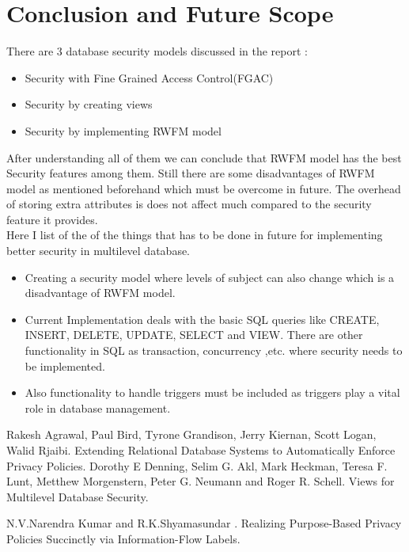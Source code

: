 \documentclass[11pt,a4paper]{report}
\begin{document}
\chapter{Conclusion and Future Scope}
There are 3 database security models discussed in the report : 
\begin{itemize}
    \item Security with Fine Grained Access Control(FGAC)
    \item Security by creating views 
    \item Security by implementing RWFM model 
\end{itemize}
After understanding all of them we can conclude that RWFM model has the best Security features among them. Still there are some disadvantages of RWFM model as mentioned beforehand which must be overcome in future. The overhead of storing extra attributes is does not affect much compared to the security feature it provides. \\[2em]
Here I list of the of the things that has to be done in future for implementing better security in multilevel database. 
\begin{itemize}
    \item Creating a security model where levels of subject can also change which is a disadvantage of RWFM model.
    \item Current Implementation deals with the basic SQL queries like CREATE, INSERT, DELETE, UPDATE, SELECT and VIEW. There are other functionality in SQL as  transaction, concurrency ,etc. where security needs to be implemented.
    \item Also functionality to handle triggers must be included as triggers play a vital role in database management. 
\end{itemize}
%
%
 \begin{thebibliography}{10}
    

 
 
    

    Rakesh Agrawal, Paul Bird, Tyrone Grandison, Jerry Kiernan, Scott Logan, Walid Rjaibi.
    \newblock Extending Relational Database Systems to Automatically Enforce Privacy Policies.
     Dorothy E Denning, Selim G. Akl, Mark Heckman, Teresa F. Lunt, Metthew Morgenstern, Peter G. Neumann and Roger R. Schell.
    \newblock Views for Multilevel Database Security.
    
    N.V.Narendra Kumar and R.K.Shyamasundar .
    \newblock Realizing Purpose-Based Privacy Policies Succinctly via Information-Flow Labels.
  
  \end{thebibliography}
\end{document}
